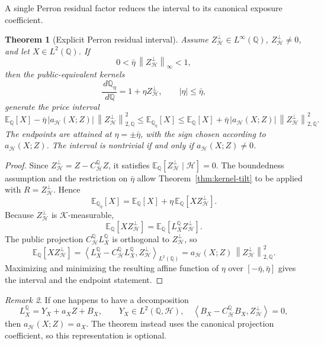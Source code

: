 \documentclass[11pt,a4paper]{amsart}
\theoremstyle{plain}
\newtheorem{theorem}{Theorem}[section]
\theoremstyle{definition}
\theoremstyle{remark}
\newtheorem{remark}[theorem]{Remark}
\newcommand{\QQ}{\mathbb{Q}}
\newcommand{\EE}{\mathbb{E}}
\newcommand{\cH}{\mathcal{H}}
\newcommand{\cK}{\mathcal{K}}
\newcommand{\dd}{\,d}
\newcommand{\norm}[1]{\left\lVert #1\right\rVert}
\newcommand{\ip}[2]{\left\langle #1,#2\right\rangle}
\begin{document}
A single Perron residual factor reduces the interval to its canonical exposure coefficient.

\begin{theorem}[Explicit Perron residual interval]\label{thm:perron-price-interval}
Assume \(Z_{\cH}^{\perp}\in L^\infty(\QQ)\), \(Z_{\cH}^{\perp}\ne0\), and let \(X\in L^2(\QQ)\).
If
\[
        0<\bar\eta\,\norm{Z_{\cH}^{\perp}}_{\infty}<1,
\]
then the public-equivalent kernels
\[
        \frac{\dd\QQ_\eta}{\dd\QQ}
        =
        1+\eta Z_{\cH}^{\perp},
        \qquad |\eta|\le\bar\eta,
\]
generate the price interval
\[
        \EE_\QQ[X]
        -
        \bar\eta\,|a_{\cH}(X;Z)|\,\norm{Z_{\cH}^{\perp}}_{2,\QQ}^{2}
        \le
        \EE_{\QQ_\eta}[X]
        \le
        \EE_\QQ[X]
        +
        \bar\eta\,|a_{\cH}(X;Z)|\,\norm{Z_{\cH}^{\perp}}_{2,\QQ}^{2}.
\]
The endpoints are attained at \(\eta=\pm\bar\eta\), with the sign chosen according to
\(a_{\cH}(X;Z)\).  The interval is nontrivial if and only if \(a_{\cH}(X;Z)\ne0\).
\end{theorem}

\begin{proof}
Since \(Z_{\cH}^{\perp}=Z-C_{\cH}^{\QQ}Z\), it satisfies
\(\EE_\QQ[Z_{\cH}^{\perp}\mid\cH]=0\).  The boundedness assumption and the restriction on
\(\bar\eta\) allow Theorem~\ref{thm:kernel-tilt} to be applied with \(R=Z_{\cH}^{\perp}\).  Hence
\[
        \EE_{\QQ_\eta}[X]
        =
        \EE_\QQ[X]+\eta\,\EE_\QQ[XZ_{\cH}^{\perp}].
\]
Because \(Z_{\cH}^{\perp}\) is \(\cK\)-measurable,
\[
        \EE_\QQ[XZ_{\cH}^{\perp}]
        =
        \EE_\QQ[L_X^\QQ Z_{\cH}^{\perp}].
\]
The public projection \(C_{\cH}^{\QQ}L_X^\QQ\) is orthogonal to \(Z_{\cH}^{\perp}\), so
\[
        \EE_\QQ[XZ_{\cH}^{\perp}]
        =
        \ip{L_X^\QQ-C_{\cH}^{\QQ}L_X^\QQ}{Z_{\cH}^{\perp}}_{L^2(\QQ)}
        =
        a_{\cH}(X;Z)\,\norm{Z_{\cH}^{\perp}}_{2,\QQ}^{2}.
\]
Maximizing and minimizing the resulting affine function of \(\eta\) over
\([-\bar\eta,\bar\eta]\) gives the interval and the endpoint statement.
\end{proof}

\begin{remark}
If one happens to have a decomposition
\[
        L_X^\QQ=Y_X+a_XZ+B_X,
        \qquad
        Y_X\in L^2(\QQ,\cH),
        \quad
        \ip{B_X-C_{\cH}^{\QQ}B_X}{Z_{\cH}^{\perp}}=0,
\]
then \(a_{\cH}(X;Z)=a_X\).  The theorem instead uses the canonical projection coefficient, so this
representation is optional.
\end{remark}
\end{document}
